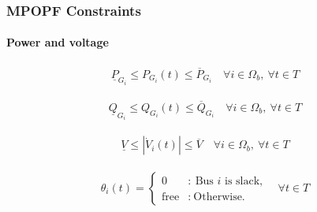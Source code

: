 \documentclass[
	11pt, %
	aspectratio=169, %
]{beamer}
\begin{document}
\begin{frame}
    \frametitle{MPOPF Constraints}
    \framesubtitle{Power and voltage} %

    \begin{align}
    \label{eq:Mcons_power_P}
        \underline{P}_{G_{i}} \leq P_{G_{i}}(t) \leq \overline{P}_{G_{i}}  \quad \forall i \in \Omega_{b},\ \forall t \in T
    \end{align}

    \begin{align}
    \label{eq:Mcons_power_Q}
        \underline{Q}_{G_{i}} \leq Q_{G_{i}}(t) \leq \overline{Q}_{G_{i}}  \quad \forall i \in \Omega_{b},\ \forall t \in T
    \end{align}

    \begin{align}
    \label{eq:Mcons_voltage}
        \underline{V} \leq \left|\dot{V}_{i}(t) \right| \leq \overline{V}  \quad \forall i \in \Omega_{b},\ \forall t \in T
    \end{align}

    \begin{align}
    \label{eq:Mcons_slack}
        \theta_{i}(t) = \left\{ \begin{array}{cl}
                            0 & : \ \text{Bus } i \text{ is slack,} \\
                            \text{free} & : \ \text{Otherwise.}
                            \end{array} \right. \quad \forall t \in T
    \end{align}

\end{frame}

\end{document}
